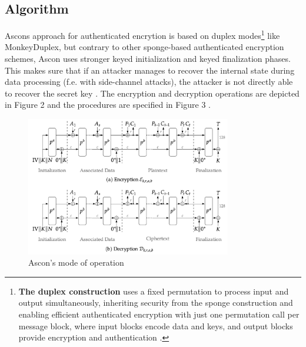 \subsection{Algorithm}
\sloppy
Ascons approach for authenticated encrytion is based on duplex modes\footnote[3]{\textbf{The duplex construction} uses a fixed permutation to process input and output simultaneously, inheriting security from the sponge construction and enabling efficient authenticated encryption with just one permutation call per message block, where input blocks encode data and keys, and output blocks provide encryption and authentication \cite{10.1007/978-3-642-28496-0_19}.} like MonkeyDuplex, but contrary to other sponge-based authenticated encryption schemes, Ascon uses stronger keyed initialization and keyed finalization phases. This makes sure that if an attacker manages to recover the internal state during data processing (f.e. with side-channel attacks), the attacker is not directly able to recover the secret key \cite[Chapter 5.1]{DBLP:journals/joc/DobraunigEMS21}.
The encryption and decryption operations are depicted in Figure 2 and the procedures are specified in Figure 3 \cite{DBLP:journals/joc/DobraunigEMS21}.
\begin{figure}[H]
    \centering
    \includegraphics[width=0.8\textwidth]{figures/aead-algorithm.png}
    \caption{Ascon's mode of operation \cite{DBLP:journals/joc/DobraunigEMS21}}
    \label{fig:aead-algorithm}
\end{figure}

